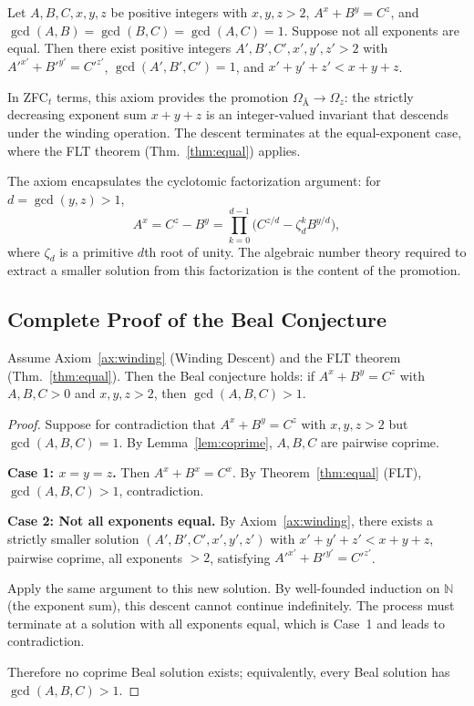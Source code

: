\documentclass[12pt]{article}
\begin{document}
\begin{axiom}\label{ax:winding}
Let $A,B,C,x,y,z$ be positive integers with $x,y,z>2$,
$A^x+B^y=C^z$, and $\gcd(A,B)=\gcd(B,C)=\gcd(A,C)=1$.
Suppose not all exponents are equal. Then there exist positive
integers $A',B',C',x',y',z'>2$ with
$A'^{x'}+B'^{y'}=C'^{z'}$,
$\gcd(A',B',C')=1$, and
$x'+y'+z' < x+y+z$.
\end{axiom}

In ZFC${}_t$ terms, this axiom provides the promotion
$\Omega_{\text{Å}} \to \Omega_z$: the strictly decreasing
exponent sum $x+y+z$ is an integer-valued invariant that descends
under the winding operation. The descent terminates at the
equal-exponent case, where the FLT theorem (Thm.~\ref{thm:equal})
applies.

The axiom encapsulates the cyclotomic factorization argument: for
$d=\gcd(y,z)>1$,
\begin{equation*}
A^x = C^z - B^y = \prod_{k=0}^{d-1}\bigl(C^{z/d} - \zeta_d^k B^{y/d}\bigr),
\end{equation*}
where $\zeta_d$ is a primitive $d$th root of unity. The algebraic
number theory required to extract a smaller solution from this
factorization is the content of the promotion.

\subsection{Complete Proof of the Beal Conjecture}

\begin{theorem}\label{thm:beal}
Assume Axiom~\ref{ax:winding} (Winding Descent) and the FLT theorem
(Thm.~\ref{thm:equal}). Then the Beal conjecture holds:
if $A^x+B^y=C^z$ with $A,B,C>0$ and $x,y,z>2$, then
$\gcd(A,B,C)>1$.
\end{theorem}

\begin{proof}
Suppose for contradiction that $A^x+B^y=C^z$ with $x,y,z>2$ but
$\gcd(A,B,C)=1$. By Lemma~\ref{lem:coprime}, $A,B,C$ are pairwise
coprime.

\textbf{Case 1: $x=y=z$.} Then $A^x+B^x=C^x$. By Theorem~\ref{thm:equal}
(FLT), $\gcd(A,B,C)>1$, contradiction.

\textbf{Case 2: Not all exponents equal.} By Axiom~\ref{ax:winding},
there exists a strictly smaller solution
$(A',B',C',x',y',z')$ with $x'+y'+z' < x+y+z$,
pairwise coprime, all exponents $>2$, satisfying
$A'^{x'}+B'^{y'}=C'^{z'}$.

Apply the same argument to this new solution. By well-founded
induction on $\mathbb{N}$ (the exponent sum), this descent cannot
continue indefinitely. The process must terminate at a solution
with all exponents equal, which is Case~1 and leads to contradiction.

Therefore no coprime Beal solution exists; equivalently, every
Beal solution has $\gcd(A,B,C)>1$.
\end{proof}
\end{document}
